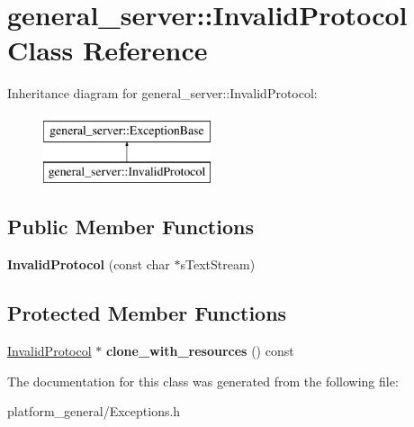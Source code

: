 \hypertarget{classgeneral__server_1_1InvalidProtocol}{\section{general\-\_\-server\-:\-:\-Invalid\-Protocol \-Class \-Reference}
\label{classgeneral__server_1_1InvalidProtocol}
}
\-Inheritance diagram for general\-\_\-server\-:\-:\-Invalid\-Protocol\-:\begin{figure}[H]
\begin{center}
\leavevmode
\includegraphics[height=2.000000cm]{classgeneral__server_1_1InvalidProtocol}
\end{center}
\end{figure}
\subsection*{\-Public \-Member \-Functions}
\begin{DoxyCompactItemize}
\item 
\hypertarget{classgeneral__server_1_1InvalidProtocol_a4ac7c1105b4464785f714ac3055e2271}{{\bfseries \-Invalid\-Protocol} (const char $\ast$s\-Text\-Stream)}\label{classgeneral__server_1_1InvalidProtocol_a4ac7c1105b4464785f714ac3055e2271}

\end{DoxyCompactItemize}
\subsection*{\-Protected \-Member \-Functions}
\begin{DoxyCompactItemize}
\item 
\hypertarget{classgeneral__server_1_1InvalidProtocol_abd3848ab3a92f7f6b7fcbb4140f59777}{\hyperlink{classgeneral__server_1_1InvalidProtocol}{\-Invalid\-Protocol} $\ast$ {\bfseries clone\-\_\-with\-\_\-resources} () const }\label{classgeneral__server_1_1InvalidProtocol_abd3848ab3a92f7f6b7fcbb4140f59777}

\end{DoxyCompactItemize}


\-The documentation for this class was generated from the following file\-:\begin{DoxyCompactItemize}
\item 
platform\-\_\-general/\-Exceptions.\-h\end{DoxyCompactItemize}
